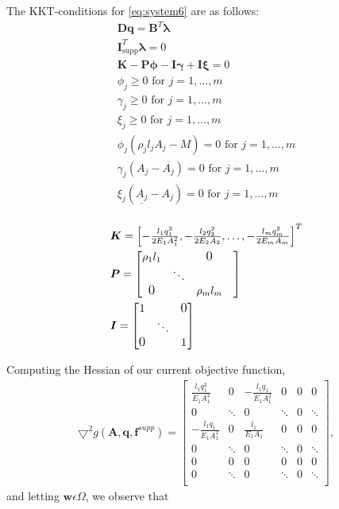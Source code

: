 

The KKT-conditions for \eqref{eq:system6} are as follows:
\begin{equation}
\label{KKT_system6}
\begin{aligned}
\bm{Dq} = \bm{B}^{T}\bm{\lambda}\\
\bm{I}^{T}_{\textrm{supp}}\bm{\lambda} = 0 \\
\bm{K} - \bm{P}\bm{\phi} - \bm{I}\bm{\gamma} + \bm{I}\bm{\xi} = 0 \\
\phi_j \geq 0  \text{ for } j = 1,...,m \\
\gamma_j \geq 0 \text{ for } j = 1,...,m \\
\xi_j \geq 0 \text{ for } j = 1,...,m \\
\phi_j(\rho_{j}l_{j}A_{j}-M) = 0 \text{ for } j = 1,...,m \\
\gamma_{j}(A_{j}-\overline{A_{j}}) = 0 \text{ for } j = 1,...,m \\
\xi_{j}(\underline{A_{j}}-A_{j}) = 0 \text{ for } j = 1,...,m \\
\end{aligned}
\end{equation}

\begin{align*}
&\bm{K} = \begin{bmatrix}
       -\frac{l_{1}q_{1}^2}{2E_{1}A_{1}^2}
       , -\frac{l_{2}q_{2}^2}{2E_{2}A_{2}}, \hdots,-\frac{l_{m}q_{m}^2}{2E_{m}A_{m}}
     \end{bmatrix}^T \\
&\bm{P} = \begin{bmatrix}
\rho_{1}l_{1} &  & \text{\large{0}}\\
 &  \ddots & & \\
\text{\large{0}} &  & \rho_{m}l_{m}
\end{bmatrix}\\
&\bm{I} = \begin{bmatrix}
1 &  &  \text{\large{0}}\\
  &  \ddots & \\
\text{\large{0}} &  & 1\\
\end{bmatrix}
\end{align*}

Computing the Hessian of our current objective function,
\begin{align*}
\bm{\bigtriangledown}^2 g(\bm{A},\bm{q},\bm{f}^{supp}) =
\left[\begin{array}{cc|cc|cc}
\frac{l_1q_1^2}{E_1A_1^3}&0& -\frac{l_1q_1}{E_1A_1^2} &0 & 0 & 0\\[0.3em]
0 &\ddots &0 & \ddots & 0 & \ddots\\[0.3em] \hline
-\frac{l_1q_1}{E_1A_1^2} & 0 & \frac{l_1}{E_1A_1} & 0 & 0 & 0\\[0.3em]
0 &\ddots & 0 &\ddots & 0 & \ddots\\[0.3em] \hline
0 & 0 & 0 & 0 & 0 & 0 \\[0.3em]
0 & \ddots & 0 & \ddots & 0 & \ddots\\[0.3em]
\end{array}\right],
\end{align*}
and letting $\bm{w}  \epsilon  \Omega$, we observe that

